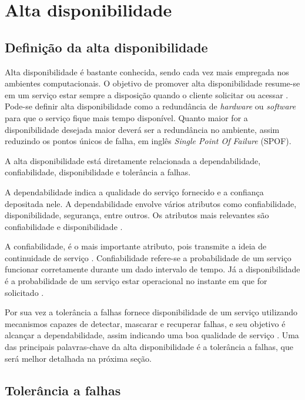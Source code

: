\chapter{Alta disponibilidade}

\section{Definição da alta disponibilidade}

Alta disponibilidade é bastante conhecida, sendo cada vez mais empregada nos ambientes computacionais.
O objetivo de promover alta disponibilidade resume-se em um serviço estar sempre 
a disposição quando o cliente solicitar ou acessar \cite{costa2009}.
Pode-se definir alta disponibilidade como a redundância de \textit{hardware} ou \textit{software} para que o serviço fique mais tempo disponível.
Quanto maior for a disponibilidade desejada maior deverá ser a redundância no ambiente, assim reduzindo os pontos únicos de falha,
em inglês \textit{Single Point Of Failure} (SPOF).

A alta disponibilidade está diretamente relacionada a dependabilidade, confiabilidade, disponibilidade e tolerância a falhas. 

A dependabilidade indica a qualidade do serviço fornecido e a confiança depositada nele. A dependabilidade envolve vários
atributos como confiabilidade, disponibilidade, segurança, entre outros. Os atributos mais relevantes são confiabilidade e disponibilidade 
\cite{weber2002}.

A confiabilidade, é o mais importante atributo, pois transmite a ideia de continuidade de serviço \cite{pankaj1994}. Confiabilidade refere-se 
a probabilidade de um serviço funcionar corretamente durante um dado intervalo de tempo. Já a disponibilidade é a probabilidade de um 
serviço estar operacional no instante em que for solicitado \cite{costa2009}.

Por sua vez a tolerância a falhas fornece disponibilidade de um serviço utilizando mecanismos capazes de detectar, mascarar e recuperar falhas, 
e seu objetivo é alcançar a dependabilidade, assim indicando uma boa qualidade de serviço \cite{costa2009}.
Uma das principais palavras-chave da alta disponibilidade é a tolerância a falhas, que será melhor detalhada na próxima seção.

\section{Tolerância a falhas}

